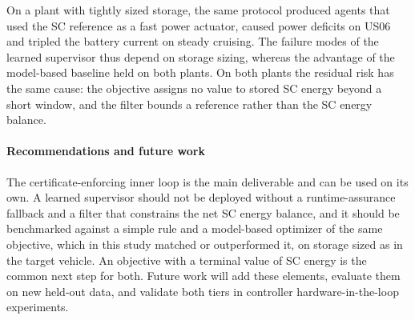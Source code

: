 On a plant with tightly sized storage, the same protocol produced agents that used the SC reference as a fast power actuator, caused power deficits on US06 and tripled the battery current on steady cruising. The failure modes of the learned supervisor thus depend on storage sizing, whereas the advantage of the model-based baseline held on both plants. On both plants the residual risk has the same cause: the objective assigns no value to stored SC energy beyond a short window, and the filter bounds a reference rather than the SC energy balance.

\paragraph{Recommendations and future work}
The certificate-enforcing inner loop is the main deliverable and can be used on its own. A learned supervisor should not be deployed without a runtime-assurance fallback and a filter that constrains the net SC energy balance, and it should be benchmarked against a simple rule and a model-based optimizer of the same objective, which in this study matched or outperformed it, on storage sized as in the target vehicle. An objective with a terminal value of SC energy is the common next step for both. Future work will add these elements, evaluate them on new held-out data, and validate both tiers in controller hardware-in-the-loop experiments.
